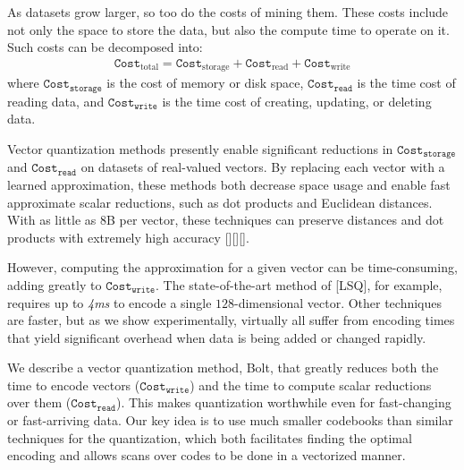 

As datasets grow larger, so too do the costs of mining them. These costs include not only the space to store the data, but also the compute time to operate on it. Such costs can be decomposed into:
\begin{align}
    \texttt{Cost}_{\text{total}} = \texttt{Cost}_{\text{storage}} + \texttt{Cost}_{\text{read}} + \texttt{Cost}_{\text{write}}
\end{align}
where $\texttt{Cost}_{\texttt{storage}}$ is the cost of memory or disk space, $\texttt{Cost}_{\texttt{read}}$ is the time cost of reading data, and $\texttt{Cost}_{\texttt{write}}$ is the time cost of creating, updating, or deleting data.

Vector quantization methods presently enable significant reductions in $\texttt{Cost}_{\texttt{storage}}$ and $\texttt{Cost}_{\texttt{read}}$ on datasets of real-valued vectors. By replacing each vector with a learned approximation, these methods both decrease space usage and enable fast approximate scalar reductions, such as dot products and Euclidean distances. With as little as 8B per vector, these techniques can preserve distances and dot products with extremely high accuracy [][][].






However, computing the approximation for a given vector can be time-consuming, adding greatly to $\texttt{Cost}_{\texttt{write}}$. The state-of-the-art method of [LSQ], for example, requires up to \textit{4ms} to encode a single $128$-dimensional vector. Other techniques are faster, but as we show experimentally, virtually all suffer from encoding times that yield significant overhead when data is being added or changed rapidly.

We describe a vector quantization method, Bolt, that greatly reduces both the time to encode vectors ($\texttt{Cost}_{\texttt{write}}$) and the time to compute scalar reductions over them ($\texttt{Cost}_{\texttt{read}}$). This makes quantization worthwhile even for fast-changing or fast-arriving data. Our key idea is to use much smaller codebooks than similar techniques for the quantization, which both facilitates finding the optimal encoding and allows scans over codes to be done in a vectorized manner.

